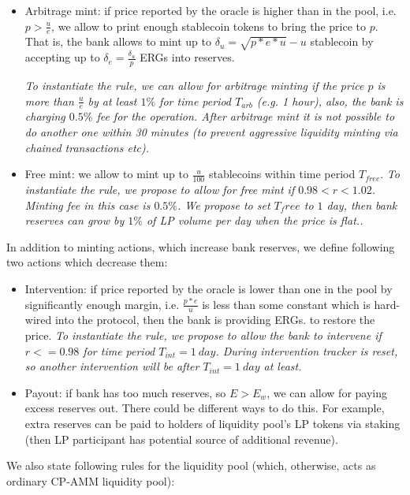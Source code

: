 \documentclass{article}   %
\newcommand{\bc}{ERG}
\newcommand{\sct}{stablecoin}
\begin{document}
\begin{itemize}
  \item{Arbitrage mint: } if price reported by the oracle is higher than in the pool, i.e. $p > \frac{u}{e}$, we allow to print enough \sct{} tokens to bring the price to $p$. That is, the bank allows to mint up to $\delta_u = \sqrt{p*e*u}-u$ \sct{} by accepting up to $\delta_e = \frac{\delta_u}{p}$ \bc{}s into reserves. 

  \em{To instantiate the rule, we can allow for arbitrage minting if the price $p$ is more than $\frac{u}{e}$ by at least $1\%$ for time period $T_{arb}$ (e.g. 1 hour), also, the bank is charging $0.5\%$ fee for the operation. After arbitrage mint it is not possible to do another one within 30 minutes (to prevent aggressive liquidity minting via chained transactions etc).} 

  \item{Free mint: } we allow to mint up to $\frac{u}{100}$ \sct{}s within time period $T_{free}$. 
  \em{To instantiate the rule, we propose to allow for free mint if $0.98 < r < 1.02$. Minting fee in this case is $0.5\%$. We propose to set $T_free$ to $1$ day, then bank reserves can grow by $1\%$ of LP volume per day when the price is flat.}. 
\end{itemize}  

In addition to minting actions, which increase bank reserves, we define following two actions which decrease them: 

\begin{itemize}
   \item{Intervention: } if price reported by the oracle is lower than one in the pool by significantly enough margin, i.e. $\frac{p*e}{u}$ is less than some constant which is hard-wired into the protocol, then the bank is providing \bc{}s. to restore the price.
   \em{To instantiate the rule, we propose to allow the bank to intervene if $r <= 0.98$ for time period $T_{int} = 1 {\ day}$.
       During intervention tracker is reset, so another intervention will be after $T_{int} = 1 {\ day}$ at least. }
   \item{Payout: } if bank has too much reserves, so $E > E_w$, we can allow for paying excess reserves out. There could be different ways to do this. For example, extra reserves can be paid to holders of liquidity pool's LP tokens via staking (then LP participant has potential source of additional revenue).
\end{itemize}


We also state following rules for the liquidity pool (which, otherwise, acts as ordinary CP-AMM liquidity pool): 
\end{document}
